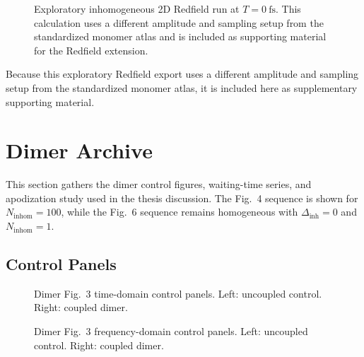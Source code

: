 \begin{figure}[p]
    \centering
    \caption{Exploratory inhomogeneous 2D Redfield run at $T=\SI{0}{\femto\second}$. This calculation uses a different amplitude and sampling setup from the standardized monomer atlas and is included as supporting material for the Redfield extension.}
    \label{fig:app_monomer_legacy_redfield}
\end{figure}
Because this exploratory Redfield export uses a different amplitude and sampling setup from the standardized monomer atlas, it is included here as supplementary supporting material.

\section{Dimer Archive}
\label{app:sec:paper_eqs_dimer}

This section gathers the dimer control figures, waiting-time series, and apodization study used in the thesis discussion. The Fig.~4 sequence is shown for $N_{\mathrm{inhom}}=100$, while the Fig.~6 sequence remains homogeneous with $\Delta_{\mathrm{inh}}=0$ and $N_{\mathrm{inhom}}=1$.

\subsection{Control Panels}

\begin{figure}[p]
    \centering
    \begin{minipage}[t]{0.49\linewidth}
        \centering
        \safeplaceholdergraphic[0.98\linewidth]{\dimerFigThreeUncoupledPaperTimePath}
    \end{minipage}\hfill
    \begin{minipage}[t]{0.49\linewidth}
        \centering
        \safeplaceholdergraphic[0.98\linewidth]{\dimerFigThreeCoupledPaperTimePath}
    \end{minipage}
    \caption{Dimer Fig.~3 time-domain control panels. Left: uncoupled control. Right: coupled dimer.}
    \label{fig:app_dimer_fig3_time}
\end{figure}

\begin{figure}[p]
    \centering
    \begin{minipage}[t]{0.49\linewidth}
        \centering
        \safeplaceholdergraphic[0.98\linewidth]{\dimerFigThreeUncoupledPaperPath}
    \end{minipage}\hfill
    \begin{minipage}[t]{0.49\linewidth}
        \centering
        \safeplaceholdergraphic[0.98\linewidth]{\dimerFigThreeCoupledPaperPath}
    \end{minipage}
    \caption{Dimer Fig.~3 frequency-domain control panels. Left: uncoupled control. Right: coupled dimer.}
    \label{fig:app_dimer_fig3_freq}
\end{figure}

